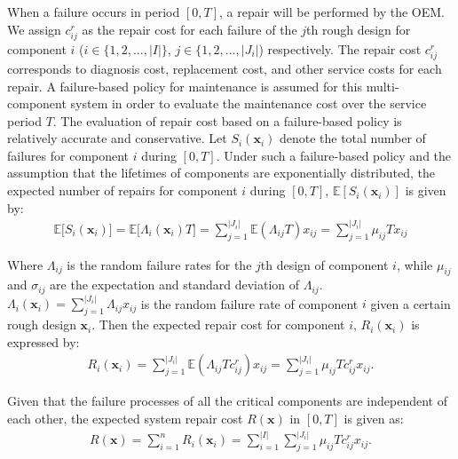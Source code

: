 \documentclass[preprint,12pt]{elsarticle}
\begin{document}
When a failure occurs in period $[0, T]$, a repair will be performed by the OEM. We assign $c^r_{ij}$ as the repair cost for each failure of the $j$th rough design for component $i$ ($i \in \{1,2,...,\lvert I \rvert \}$, $j \in \{1,2,..., \lvert J_{i} \rvert $) respectively. The repair cost $c^r_{ij}$ corresponds to diagnosis cost, replacement cost, and other service costs for each repair. A failure-based policy for maintenance is assumed for this multi-component system in order to evaluate the maintenance cost over the service period $T$. The evaluation of repair cost based on a failure-based policy is relatively accurate and conservative. Let $S_{i}(\boldsymbol{x}_{i})$ denote the total number of failures for component $i$ during $[0,T]$. Under such a failure-based policy and the assumption that the lifetimes of components are exponentially distributed, the expected number of repairs for component $i$ during $[0,T]$, $\mathbb{E}[S_{i}(\boldsymbol{x}_{i})]$ is given by:
\small
\begin {eqnarray}
\mathbb{E}\bigg[S_{i}(\boldsymbol{x}_{i})\bigg]=\mathbb{E}\bigg[\Lambda_{i}(\boldsymbol{x}_{i})T\bigg] =\sum_{j=1}^{\rvert J_{i} \lvert}{\mathbb{E}(\Lambda_{ij}T)x_{ij}}=\sum_{j=1}^{\rvert J_{i} \lvert}{\mu_{ij}T}x_{ij}
\end {eqnarray}
\normalsize

Where $\Lambda_{ij}$ is the random failure rates for the $j$th design of component $i$, while $\mu_{ij}$ and $\sigma_{ij}$ are the expectation and standard deviation of $\Lambda_{ij}$. $\Lambda_{i}(\boldsymbol{x}_{i})=\sum_{j=1}^{\rvert J_{i} \lvert}{\Lambda_{ij}x_{ij}}$ is the random failure rate of component $i$ given a certain rough design $\boldsymbol{x}_{i}$. Then the expected repair cost for component $i$, $R_{i}(\boldsymbol{x}_{i})$ is expressed by:
\small
\begin {eqnarray}
R_{i}(\boldsymbol{x}_{i}) = \sum_{j=1}^{\rvert J_{i} \lvert}{\mathbb{E}(\Lambda_{ij}Tc^r_{ij})x_{ij}}= \sum_{j=1}^{\rvert J_{i} \lvert}{\mu_{ij}Tc^r_{ij}}x_{ij}. \label{ERi}
\end {eqnarray}
\normalsize

Given that the failure processes of all the critical components are independent of each other, the expected system repair cost $R(\boldsymbol{x})$ in $[0,T]$ is given as:
\small
\begin {eqnarray}
 R(\boldsymbol{x}) = \sum_{i=1}^{n}{R_{i}(\boldsymbol{x}_{i})} = \sum_{i=1}^{\rvert I \lvert}\sum_{j=1}^{\rvert J_{i} \lvert}{\mu_{ij}Tc^r_{ij}}x_{ij}.\label{ER}
\end {eqnarray}
\normalsize
\end{document}
